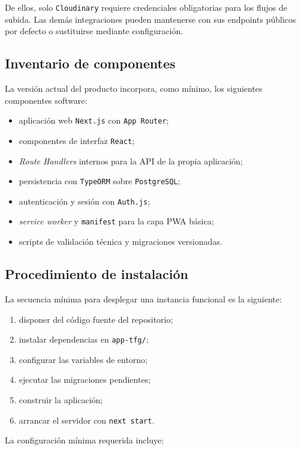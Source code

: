 De ellos, solo \texttt{Cloudinary} requiere credenciales obligatorias para los flujos de subida. Las demás integraciones pueden mantenerse con sus endpoints públicos por defecto o sustituirse mediante configuración.

\subsection{Inventario de componentes}

La versión actual del producto incorpora, como mínimo, los siguientes componentes software:

\begin{itemize}
    \item aplicación web \texttt{Next.js} con \texttt{App Router};
    \item componentes de interfaz \texttt{React};
    \item \textit{Route Handlers} internos para la API de la propia aplicación;
    \item persistencia con \texttt{TypeORM} sobre \texttt{PostgreSQL};
    \item autenticación y sesión con \texttt{Auth.js};
    \item \textit{service worker} y \texttt{manifest} para la capa PWA básica;
    \item scripts de validación técnica y migraciones versionadas.
\end{itemize}

\subsection{Procedimiento de instalación}

La secuencia mínima para desplegar una instancia funcional es la siguiente:

\begin{enumerate}
    \item disponer del código fuente del repositorio;
    \item instalar dependencias en \texttt{app-tfg/};
    \item configurar las variables de entorno;
    \item ejecutar las migraciones pendientes;
    \item construir la aplicación;
    \item arrancar el servidor con \texttt{next start}.
\end{enumerate}

La configuración mínima requerida incluye:

